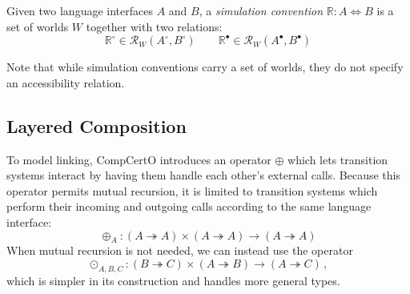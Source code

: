 \documentclass[acmsmall,screen,review,anonymous]{acmart}
\newcommand{\que}{\circ}
\newcommand{\ans}{\bullet}
\begin{document}
\begin{definition} \label{def:simconv}
Given two language interfaces $A$ and $B$,
a \emph{simulation convention} $\mathbb{R} : A \Leftrightarrow B$
is a set of worlds $W$ together with two relations:
\[
  \mathbb{R}^\que \in \mathcal{R}_W(A^\que, B^\que)
  \qquad
  \mathbb{R}^\ans \in \mathcal{R}_W(A^\ans, B^\ans)
\]
\end{definition}

Note that while simulation conventions
carry a set of worlds,
they do not specify an accessibility relation.

\begin{definition} \label{def:sim}
\end{definition}

\begin{definition} \label{def:ccomp}
\end{definition}

\begin{theorem} \label{thm:vcomp}
\end{theorem}



\subsection{Layered Composition} \label{sec:basic:lcomp} %

To model linking,
CompCertO introduces an operator $\oplus$
which lets transition systems interact
by having them handle each other's external calls.
Because this operator permits mutual recursion,
it is limited to transition systems which perform
their incoming and outgoing calls
according to the same language interface:
\[
  {\oplus_A} :
    (A \twoheadrightarrow A) \times
    (A \twoheadrightarrow A) \rightarrow
    (A \twoheadrightarrow A)
\]
When mutual recursion is not needed,
we can instead use the operator
\[
  {\odot_{A,B,C}} :
    (B \twoheadrightarrow C) \times
    (A \twoheadrightarrow B) \rightarrow
    (A \twoheadrightarrow C)
  \,,
\]
which is simpler in its construction
and handles more general types.

\end{document}
